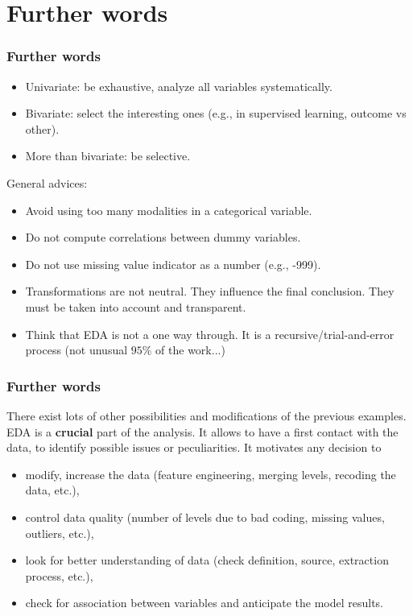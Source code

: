 \section{Further words}
\begin{frame}
\frametitle{Further words}
\begin{itemize}
\item Univariate: be exhaustive, analyze all variables systematically.
\item Bivariate: select the interesting ones (e.g., in supervised learning, outcome vs other).
\item More than bivariate: be selective.
\end{itemize}
General advices:
\begin{itemize}
\item Avoid using too many modalities in a categorical variable.
\item Do not compute correlations between dummy variables.
\item Do not use missing value indicator as a number (e.g., -999).
\item Transformations are not neutral. They influence the final conclusion. They must be taken into account and transparent.
\item Think that EDA is not a one way through. It is a recursive/trial-and-error process (not unusual $95\%$ of the work...)
\end{itemize}
\end{frame}


\begin{frame}
\frametitle{Further words}
There exist lots of other possibilities and modifications of the previous examples. EDA is a {\bf crucial} part of the analysis. It allows to have a first contact with the data, to identify possible issues or peculiarities. It motivates any decision to
\begin{itemize}
\item modify, increase the data (feature engineering, merging levels, recoding the data, etc.),
\item control data quality (number of levels due to bad coding, missing values, outliers, etc.),
\item look for better understanding of data (check definition, source, extraction process, etc.),
\item check for association between variables and anticipate the model results.
\end{itemize}
\end{frame}

